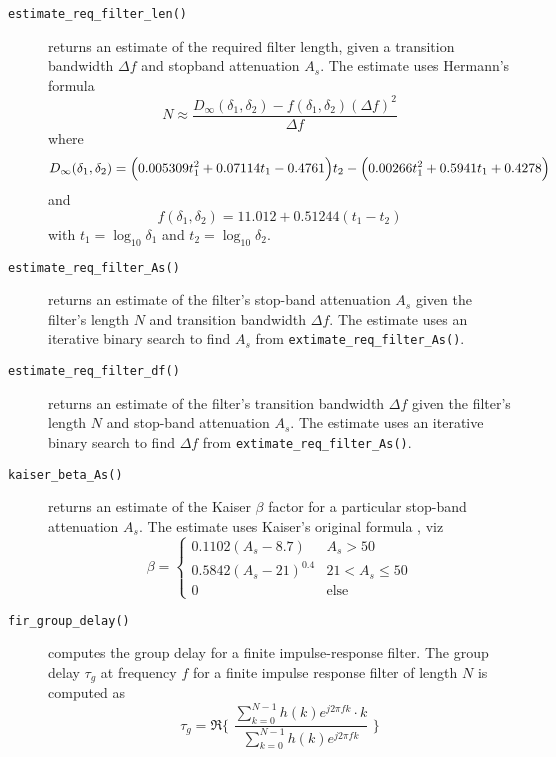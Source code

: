 \begin{description}
\item[{\tt estimate\_req\_filter\_len()}]
    returns an estimate of the required filter length, given a transition
    bandwidth $\Delta f$ and stopband attenuation $A_s$.
    The estimate uses Hermann's formula \cite{Herrmann:1973}
    \[
        N \approx \frac{
                D_{\infty}(\delta_1,\delta_2) - f(\delta_1,\delta_2)(\Delta f)^2
            }{
                \Delta f
            }
    \]
    where
    \[
        D_{\infty} (\delta_1,\delta_2) =
            \Bigl(0.005309 t_1^2 + 0.07114 t_1 - 0.4761 \Bigr) t_2
           -\Bigl(0.00266  t_1^2 + 0.5941  t_1 + 0.4278 \Bigr)
    \]
    and
    \[
        f(\delta_1,\delta_2) = 11.012 + 0.51244\left(t_1 - t_2\right)
    \]
    with $t_1 = \log_{10}\delta_1$ and $t_2 = \log_{10}\delta_2$.

\item[{\tt estimate\_req\_filter\_As()}]
    returns an estimate of the filter's stop-band attenuation $A_s$
    given the filter's length $N$ and transition bandwidth $\Delta f$.
    The estimate uses an iterative binary search to find $A_s$ from
    {\tt extimate\_req\_filter\_As()}.

\item[{\tt estimate\_req\_filter\_df()}]
    returns an estimate of the filter's transition bandwidth $\Delta f$
    given the filter's length $N$ and stop-band attenuation $A_s$.
    The estimate uses an iterative binary search to find $\Delta f$ from
    {\tt extimate\_req\_filter\_As()}.

\item[{\tt kaiser\_beta\_As()}]
    returns an estimate of the Kaiser $\beta$ factor for a particular
    stop-band attenuation $A_s$.
    The estimate uses Kaiser's original formula \cite{Vaidyanathan:1993}, viz
    \[
    \beta =
    \begin{cases}
        0.1102 (A_s - 8.7)      &   A_s > 50 \\
        0.5842 (A_s - 21)^{0.4} &   21 < A_s \le 50 \\
        0                       &   \text{else}
    \end{cases}
    \]

\item[{\tt fir\_group\_delay()}]
    computes the group delay for a finite impulse-response filter.
    The group delay $\tau_g$ at frequency $f$
    for a finite impulse response filter of length $N$
    is computed as
    \[
        \tau_g = \Re\Biggl\{ \,\,
            \frac{
                \sum_{k=0}^{N-1}{h(k)e^{j 2 \pi f k} \cdot k}
            } {
                \sum_{k=0}^{N-1}{h(k)e^{j 2 \pi f k}}
            }\,\,
            \Biggr\}
    \]


\end{description}
